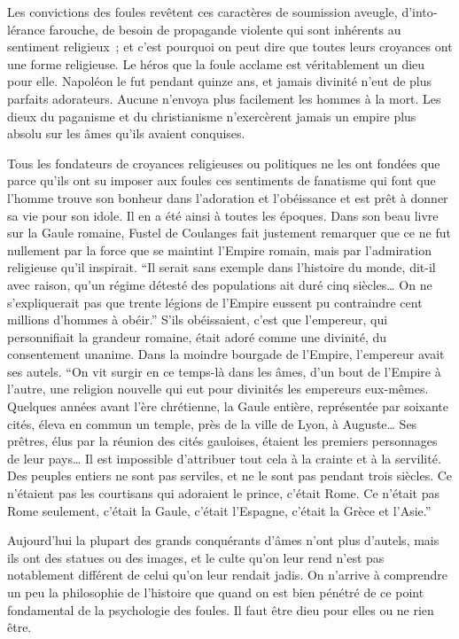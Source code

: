 \documentclass[french,twoside]{book} %
\begin{document}
Les convictions des foules revêtent ces caractères de soumission aveugle, d’into­lérance farouche, de besoin de propagande violente qui sont inhérents au sentiment religieux ; et c’est pourquoi on peut dire que toutes leurs croyances ont une forme religieuse. Le héros que la foule acclame est véritablement un dieu pour elle. Napo­léon le fut pendant quinze ans, et jamais divinité n’eut de plus parfaits adorateurs. Aucune n’envoya plus facilement les hommes à la mort. Les dieux du paganisme et du christianisme n’exercèrent jamais un empire plus absolu sur les âmes qu’ils avaient conquises.\par
Tous les fondateurs de croyances religieuses ou politiques ne les ont fondées que parce qu’ils ont su imposer aux foules ces sentiments de fanatisme qui font que l’homme trouve son bonheur dans l’adoration et l’obéissance et est prêt à donner sa vie pour son idole. Il en a été ainsi à toutes les époques. Dans son beau livre sur la Gaule romaine, Fustel de Coulanges fait juste­ment remarquer que ce ne fut nullement par la force que se maintint l’Empire romain, mais par l’admiration religieuse qu’il inspirait. “Il serait sans exemple dans l’histoire du monde, dit-il avec raison, qu’un régime détesté des populations ait duré cinq siècles… On ne s’expliquerait pas que trente légions de l’Empire eussent pu contraindre cent millions d’hommes à obéir.” S’ils obéissaient, c’est que l’empereur, qui personnifiait la grandeur romaine, était adoré comme une divinité, du consentement unanime. Dans la moindre bourgade de l’Empire, l’empereur avait ses autels. “On vit surgir en ce temps-là dans les âmes, d’un bout de l’Empire à l’autre, une religion nouvelle qui eut pour divinités les empe­reurs eux-mêmes. Quelques années avant l’ère chrétienne, la Gaule entière, repré­sentée par soixante cités, éleva en commun un temple, près de la ville de Lyon, à Auguste… Ses prêtres, élus par la réunion des cités gauloises, étaient les premiers personnages de leur pays… Il est impossible d’attribuer tout cela à la crainte et à la servilité. Des peuples entiers ne sont pas serviles, et ne le sont pas pendant trois siècles. Ce n’étaient pas les courtisans qui adoraient le prince, c’était Rome. Ce n’était pas Rome seulement, c’était la Gaule, c’était l’Es­pagne, c’était la Grèce et l’Asie.”\par
Aujourd’hui la plupart des grands conquérants d’âmes n’ont plus d’autels, mais ils ont des statues ou des images, et le culte qu’on leur rend n’est pas notablement dif­férent de celui qu’on leur rendait jadis. On n’arrive à comprendre un peu la philoso­phie de l’histoire que quand on est bien pénétré de ce point fondamental de la psychologie des foules. Il faut être dieu pour elles ou ne rien être.\par
\end{document}

